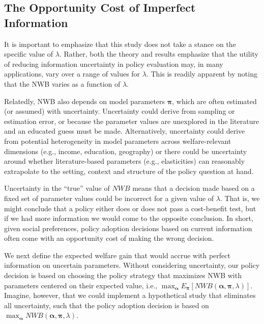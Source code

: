 \documentclass[
  10pt,
]{article}
\begin{document}
\hypertarget{the-opportunity-cost-of-imperfect-information}{%
\subsection{The Opportunity Cost of Imperfect
Information}\label{the-opportunity-cost-of-imperfect-information}}

It is important to emphasize that this study does not take a stance on
the specific value of \(\lambda\). Rather, both the theory and results
emphasize that the utility of reducing information uncertainty in policy
evaluation may, in many applications, vary over a range of values for
\(\lambda\). This is readily apparent by noting that the NWB varies as a
function of \(\lambda\).

Relatedly, NWB also depends on model parameters \(\boldsymbol{\pi}\),
which are often estimated (or assumed) with uncertainty. Uncertainty
could derive from sampling or estimation error, or because the parameter
values are unexplored in the literature and an educated guess must be
made. Alternatively, uncertainty could derive from potential
heterogeneity in model parameters across welfare-relevant dimensions
(e.g., income, education, geography) or there could be uncertainty
around whether literature-based parameters (e.g., elasticities) can
reasonably extrapolate to the setting, context and structure of the
policy question at hand.

Uncertainty in the ``true'' value of \(NWB\) means that a decision made
based on a fixed set of parameter values could be incorrect for a given
value of \(\lambda\). That is, we might conclude that a policy either
does or does not pass a cost-benefit test, but if we had more
information we would come to the opposite conclusion. In short, given
social preferences, policy adoption decisions based on current
information often come with an opportunity cost of making the wrong
decision.

We next define the expected welfare gain that would accrue with perfect
information on uncertain parameters. Without considering uncertainty,
our policy decision is based on choosing the policy strategy that
maximizes NWB with parameters centered on their expected value, i.e.,
\(\max_{\boldsymbol{\alpha}} E_{\boldsymbol{\pi}}[NWB(\boldsymbol{\alpha},\boldsymbol{\pi},\lambda)]\).
Imagine, however, that we could implement a hypothetical study that
eliminates all uncertainty, such that the policy adoption decision is
based on
\(\max_{\boldsymbol{\alpha}} NWB(\boldsymbol{\alpha},\boldsymbol{\pi},\lambda)\).
\end{document}
